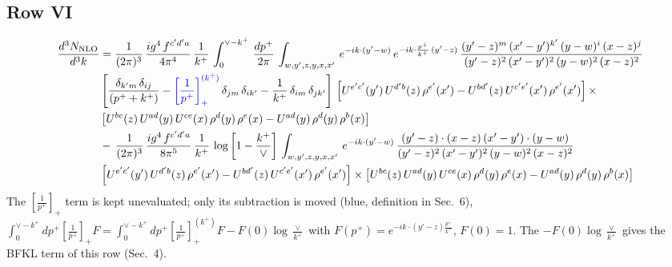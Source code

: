 \documentclass[9pt]{article}
\newcommand{\new}[1]{{\color{blue}#1}}
\numberwithin{equation}{section}
\begin{document}
\subsection{Row VI}
\begin{align}
    \frac{d^{3}N_{\rm NLO}}{d^{3}k} & = \frac{1}{(2\pi)^{3}}\, \frac{ig^{4}\,f^{c'd'a}}{4\pi^{4}}\, \frac{1}{k^{+}}\,\int_{0}^{\vee-k^{+}}\, \frac{dp^{+}}{2\pi}\, \int_{w,y',z,y,x,x'}\, e^{-ik\cdot (y'-w)}\, e^{-ik\cdot \frac{p^{+}}{k^{+}}\,(y'-z)}\,\frac{(y'-z)^{m}\,(x'-y')^{k'}\,(y-w)^{i}\,(x-z)^{j}}{(y'-z)^{2}\,(x'-y')^{2}\,(y-w)^{2}\,(x-z)^{2}}\notag \\ & \left[\frac{\delta_{k'm}\,\delta_{ij}}{(p^{+}+k^{+})}-\new{\left[\frac{1}{p^{+}}\right]_{+}^{(k^{+})}}\,\delta_{jm}\,\delta_{ik'}-\frac{1}{k^{+}}\, \delta_{im}\, \delta_{jk'}\right]\, \left[U^{e'c'}(y')\,U^{d'b}(z)\,\rho^{e'}(x')-U^{bd'}(z)\,U^{c'e'}(x')\,\rho^{e'}(x')\right]\times\notag \\ &  \left[U^{bc}(z)\,U^{ad}(y)\,U^{ce}(x)\,\rho^{d}(y)\,\rho^{e}(x)-U^{ad}(y)\,\rho^{d}(y)\,\rho^{b}(x)\right]\notag \\ &  -\,\frac{1}{(2\pi)^{3}}\, \frac{ig^{4}\,f^{c'd'a}}{8\pi^{5}}\, \frac{1}{k^{+}}\, \log{\left[1-\frac{k^{+}}{\vee}\right]}\, \int_{w,y',z,y,x,x'}\, e^{-ik\cdot (y'-w)}\,\frac{(y'-z)\cdot (x-z)\,(x'-y')\cdot (y-w)}{(y'-z)^{2}\,(x'-y')^{2}\,(y-w)^{2}\,(x-z)^{2}}\notag \\ & \left[U^{e'c'}(y')\,U^{d'b}(z)\,\rho^{e'}(x')-U^{bd'}(z)\,U^{c'e'}(x')\,\rho^{e'}(x')\right]\times  \left[U^{bc}(z)\,U^{ad}(y)\,U^{ce}(x)\,\rho^{d}(y)\,\rho^{e}(x)-U^{ad}(y)\,\rho^{d}(y)\,\rho^{b}(x)\right]
\end{align}
\new{The $\left[\frac{1}{p^+}\right]_+$ term is kept unevaluated; only its subtraction is moved (blue, definition in Sec.~6), $\int_0^{\vee-k^+}dp^+\left[\frac{1}{p^+}\right]_+F=\int_0^{\vee-k^+}dp^+\left[\frac{1}{p^+}\right]_+^{(k^+)}F-F(0)\log\frac{\vee}{k^+}$ with $F(p^+)=e^{-ik\cdot(y'-z)\frac{p^+}{k^+}}$, $F(0)=1$. The $-F(0)\log\frac{\vee}{k^+}$ gives the BFKL term of this row (Sec.~4).}
\end{document}
